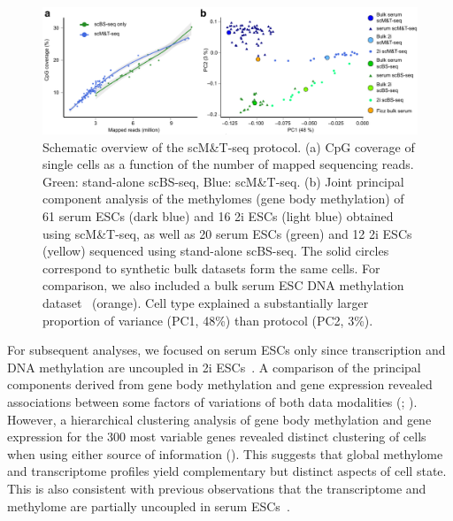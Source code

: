 \begin{figure}[htbp!]
\centering
\includegraphics[width=1.0\textwidth]{qc}
\caption[Quality controls of scM\&T-seq protocol.]{Schematic overview of the scM\&T-seq protocol. (a) CpG coverage of single cells as a function of the number of mapped sequencing reads. Green: stand-alone scBS-seq, Blue: scM\&T-seq. (b) Joint principal component analysis of the methylomes (gene body methylation) of 61 serum ESCs (dark blue) and 16 2i ESCs (light blue) obtained using scM\&T-seq, as well as 20 serum ESCs (green) and 12 2i ESCs (yellow) sequenced using stand-alone scBS-seq. The solid circles correspond to synthetic bulk datasets form the same cells. For comparison, we also included a bulk serum ESC DNA methylation dataset~\citep{ficz_fgf_2013} (orange). Cell type explained a substantially larger proportion of variance (PC1, 48\%) than protocol (PC2, 3\%).}
\label{fig:mt_qc}
\end{figure}

For subsequent analyses, we focused on serum ESCs only since transcription and DNA methylation are uncoupled in 2i ESCs~\citep{ficz_fgf_2013,habibi_whole-genome_2013}. A comparison of the principal components derived from gene body methylation and gene expression revealed associations between some factors of variations of both data modalities (; ). However, a hierarchical clustering analysis of gene body methylation and gene expression for the 300 most variable genes revealed distinct clustering of cells when using either source of information (). This suggests that global methylome and transcriptome profiles yield complementary but distinct aspects of cell state. This is also consistent with previous observations that the transcriptome and methylome are partially uncoupled in serum ESCs~\citep{ficz_fgf_2013}.

